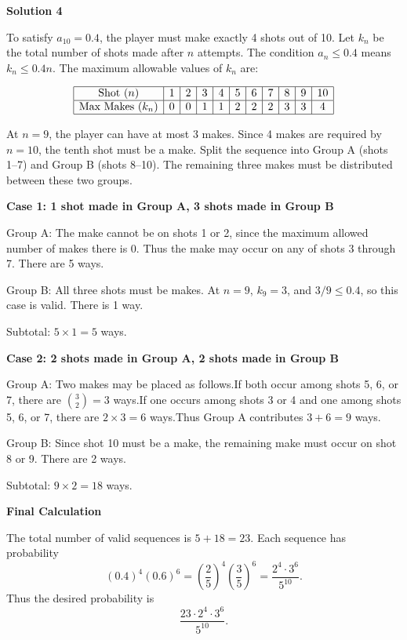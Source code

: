\begin{enumerate}
 


 



\textbf{Solution 4}

To satisfy $a_{10} = 0.4$, the player must make exactly 4 shots out of 10. Let $k_n$ be the total number of shots made after $n$ attempts. The condition $a_n \le 0.4$ means $k_n \le 0.4n$. The maximum allowable values of $k_n$ are:

 
 \[\begin{array}{|c|c|c|c|c|c|c|c|c|c|c|} \hline \text{Shot } (n) & 1 & 2 & 3 & 4 & 5 & 6 & 7 & 8 & 9 & 10 \\ \hline \text{Max Makes } (k_n) & 0 & 0 & 1 & 1 & 2 & 2 & 2 & 3 & 3 & 4 \\ \hline \end{array}\]

 At $n=9$, the player can have at most 3 makes. Since 4 makes are required by $n=10$, the tenth shot must be a make. Split the sequence into Group A (shots 1–7) and Group B (shots 8–10). The remaining three makes must be distributed between these two groups.

 \textbf{Case 1: 1 shot made in Group A, 3 shots made in Group B}

 Group A: The make cannot be on shots 1 or 2, since the maximum allowed number of makes there is 0. Thus the make may occur on any of shots 3 through 7. There are 5 ways.

 Group B: All three shots must be makes. At $n=9$, $k_9 = 3$, and $3/9 \le 0.4$, so this case is valid. There is 1 way.

 Subtotal: $5 \times 1 = 5$ ways.

 \textbf{Case 2: 2 shots made in Group A, 2 shots made in Group B}

 Group A: Two makes may be placed as follows.If both occur among shots 5, 6, or 7, there are $\binom{3}{2} = 3$ ways.If one occurs among shots 3 or 4 and one among shots 5, 6, or 7, there are $2 \times 3 = 6$ ways.Thus Group A contributes $3 + 6 = 9$ ways.

 Group B: Since shot 10 must be a make, the remaining make must occur on shot 8 or 9. There are 2 ways.

 Subtotal: $9 \times 2 = 18$ ways.

 \textbf{Final Calculation}

 The total number of valid sequences is $5 + 18 = 23$. Each sequence has probability
 \[(0.4)^4(0.6)^6 = \left(\frac{2}{5}\right)^4\left(\frac{3}{5}\right)^6 = \frac{2^4 \cdot 3^6}{5^{10}}.\]Thus the desired probability is
 \[\frac{23 \cdot 2^4 \cdot 3^6}{5^{10}}.\]


\end{enumerate}
